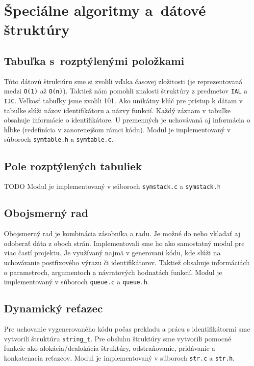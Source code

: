 \documentclass[a4paper, 11pt]{article}
\begin{document}
    \section{Špeciálne algoritmy a~dátové štruktúry}

    \subsection{Tabuľka s~rozptýlenými položkami}
    Túto dátovú štruktúru sme si zvolili vďaka časovej zložitosti
    (je reprezentovaná medzi \texttt{O(1)} až \texttt{O(n)}). Taktiež nám pomohli znalosti štruktúry z
    predmetov \texttt{IAL} a \texttt{IJC}. Veľkosť tabuľky jsme zvolili 101.
    Ako unikátny kľúč pre prístup k dátam v tabulke slúži názov identifikátoru a názvy funkcií.
    Každý záznam v tabuľke obsahuje informácie o identifikátore. U premenných je uchovávaná aj informácia
    o hĺbke (redefinícia v zanorenejšom rámci kódu). Modul je implementovaný v súboroch
    \texttt{symtable.h} a \texttt{symtable.c}.


    \subsection{Pole rozptýlených tabuliek}
    TODO
    Modul je implementovaný v súboroch \texttt{symstack.c} a \texttt{symstack.h}

    \subsection{Obojsmerný rad}
    Obojsmerný rad je kombinácia zásobníka a radu. Je možné do neho vkladať aj odoberať dáta z oboch strán.
    Implementovali sme ho ako samostatný modul pre viac častí projektu.
    Je využívaný najmä v generovaní kódu, kde slúži na uchovávanie postfixového výrazu či
    identifikátorov. Taktiež obsahuje informáciách o parametroch, argumentoch a návratových hodnatách funkcií.
    Modul je implementovaný v súboroch \texttt{queue.c} a \texttt{queue.h}.


    \subsection{Dynamický reťazec}
    Pre uchovanie vygenerovaného kódu počas prekladu a prácu s identifikátormi sme vytvorili štruktúru \texttt{string\_t}.
    Pre obsluhu štruktúry sme vytvorili pomocné funkcie ako alokácia/dealokácia štruktúry,
    odstraňovanie, pridávanie a konkatenacia reťazcov.
    Modul je implementovaný v súboroch \texttt{str.c} a \texttt{str.h}.
\end{document}
